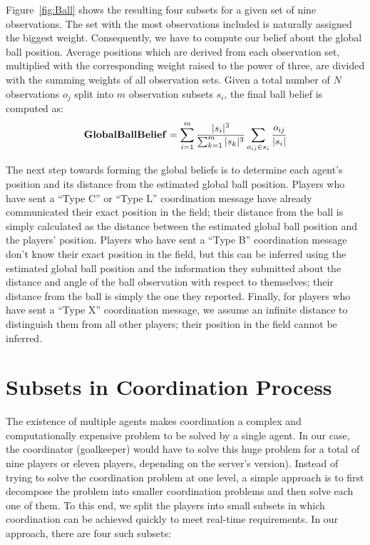 Figure~\ref{fig:Ball} shows the resulting four subsets for a given set of nine observations. The set with the most observations included is naturally assigned the biggest weight. Consequently, we have to compute our belief about the global ball position. Average positions which are derived from each observation set, multiplied with the corresponding weight raised to the power of three, are divided with the summing weights of all observation sets. Given a total number of $N$ observations $o_j$ split into $m$ observation subsets $s_i$, the final ball belief is computed as:
\begin{align*}
{\bf Global Ball Belief} = \sum_{i=1}^m \frac {|s_i|^3} {\sum_{k=1}^m |s_k|^3} \sum_{o_{ij} \in s_i} \cfrac{o_{ij}}{|s_i|}
\end{align*}


The next step towards forming the global beliefs is to determine each agent's position and its distance from the estimated global ball position. Players who have sent a ``Type C'' or ``Type L'' coordination message have already communicated their exact position in the field; their distance from the ball is simply calculated as the distance between the estimated global ball position and the players' position. Players who have sent a ``Type B'' coordination message don't know their exact position in the field, but this can be inferred using the estimated global ball position and the information they submitted about the distance and angle of the ball observation with respect to themselves; their distance from the ball is simply the one they reported. Finally, for players who have sent a ``Type X'' coordination message, we assume an infinite distance to distinguish them from all other players; their position in the field cannot be inferred. 


\section{Subsets in Coordination Process}
The existence of multiple agents makes coordination a complex and computationally expensive problem to be solved by a single agent. In our case, the coordinator (goalkeeper) would have to solve this huge problem for a total of nine players or eleven players, depending on the server's version).
Instead of trying to solve the coordination problem at one level, a simple approach is to first decompose the problem into smaller coordination problems and then solve each one of them. To this end, we split the players into small subsets in which coordination can be achieved quickly to meet real-time requirements. In our approach, there are four such subsets:

